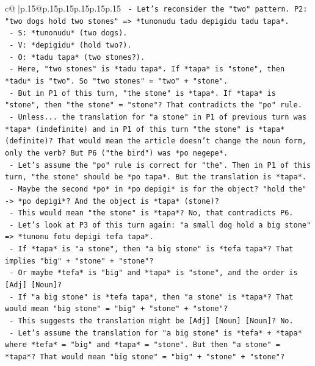\documentclass{article}
\begin{document}
{\begin{supertabular}{c@{$\;$}|p{.15\linewidth}@{}p{.15\linewidth}p{.15\linewidth}p{.15\linewidth}p{.15\linewidth}p{.15\linewidth}}
{{{\texttt{    {-} Let's reconsider the "two" pattern. P2: "two dogs hold two stones" => *tunonudu tadu depigidu tadu tapa*.} \\
\texttt{      {-} S: *tunonudu* (two dogs).} \\
\texttt{      {-} V: *depigidu* (hold two?).} \\
\texttt{      {-} O: *tadu tapa* (two stones?).} \\
\texttt{      {-} Here, "two stones" is *tadu tapa*. If *tapa* is "stone", then *tadu* is "two". So "two stones" = "two" + "stone".} \\
\texttt{      {-} But in P1 of this turn, "the stone" is *tapa*. If *tapa* is "stone", then "the stone" = "stone"? That contradicts the "po" rule.} \\
\texttt{      {-} Unless... the translation for "a stone" in P1 of previous turn was *tapa* (indefinite) and in P1 of this turn "the stone" is *tapa* (definite)? That would mean the article doesn't change the noun form, only the verb? But P6 ("the bird") was *po negepe*.} \\
\texttt{      {-} Let's assume the "po" rule is correct for "the". Then in P1 of this turn, "the stone" should be *po tapa*. But the translation is *tapa*.} \\
\texttt{      {-} Maybe the second *po* in *po depigi* is for the object? "hold the" {-}> *po depigi*? And the object is *tapa* (stone)?} \\
\texttt{      {-} This would mean "the stone" is *tapa*? No, that contradicts P6.} \\
\texttt{      {-} Let's look at P3 of this turn again: "a small dog hold a big stone" => *tunonu fotu depigi tefa tapa*.} \\
\texttt{        {-} If *tapa* is "a stone", then "a big stone" is *tefa tapa*? That implies "big" + "stone" + "stone"?} \\
\texttt{        {-} Or maybe *tefa* is "big" and *tapa* is "stone", and the order is {[}Adj{]} {[}Noun{]}?} \\
\texttt{        {-} If "a big stone" is *tefa tapa*, then "a stone" is *tapa*? That would mean "big stone" = "big" + "stone" + "stone"?} \\
\texttt{        {-} This suggests the translation might be {[}Adj{]} {[}Noun{]} {[}Noun{]}? No.} \\
\texttt{        {-} Let's assume the translation for "a big stone" is *tefa* + *tapa* where *tefa* = "big" and *tapa* = "stone". But then "a stone" = *tapa*? That would mean "big stone" = "big" + "stone" + "stone"?} \\
}}}
\end{supertabular}}
\end{document}

